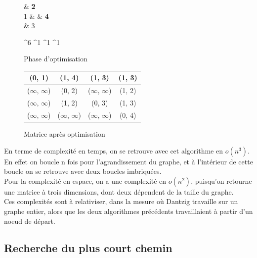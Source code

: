 \documentclass[a4paper,12pt,final] {article}
\begin{document}
\begin{figure}[h!]
 \centering
 \begin{psmatrix}[mnode=circle]
	    & {\color{red} \bf 2}\\
	 1 &    & {\color{red} \bf 4}\\
	    & 3\\
\end{psmatrix}
	
	^{6}
	^{1}
	^{1}
	^{1}

  \caption{Phase d'optimisation}
\end{figure}

\begin{figure}[h!]
\begin{center}
\begin{tabular}{|c|c|c|c|}
\hline
(0, 1) & {\color{red} \bf (1, 4)} & (1, 3) & {\color{red} \bf (1, 3)} \\
\hline
($\infty$, $\infty$) & (0, 2) & ($\infty$, $\infty$) & (1, 2) \\
\hline
($\infty$, $\infty$) & (1, 2) & (0, 3) & (1, 3)\\
\hline
($\infty$, $\infty$) & ($\infty$, $\infty$) & ($\infty$, $\infty$) & (0, 4) \\
\hline
\end{tabular}
\end{center}
\caption{Matrice après optimisation}
\end{figure}

En terme de complexité en temps, on se retrouve avec cet algorithme en $o(n^{3})$. En effet on boucle n fois pour l'agrandissement du graphe, et à l'intérieur de cette boucle on se retrouve avec deux boucles imbriquées.\\

Pour la complexité en espace, on a une complexité en $o(n^{2})$, puisqu'on retourne une matrice à trois dimensions, dont deux dépendent de la taille du graphe.\\

Ces complexités sont à relativiser, dans la mesure où Dantzig travaille sur un graphe entier, alors que les deux algorithmes précédents travaillaient à partir d'un noeud de départ.\\

\subsection{Recherche du plus court chemin}
\end{document}
